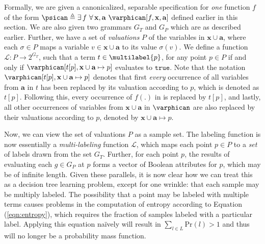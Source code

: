 Formally, we are given a canonicalized, separable \sygusbody specification
for \emph{one} function $f$ of the form $\psican \triangleq
\exists\,f\ \forall\,\mathbf{x}, \mathbf{a}\ \varphican[f, \mathbf{x},
\mathbf{a}]$ defined earlier in this section. We are also given two
grammars $G_T$ and $G_P$ which are as described earlier.  Further, we
have a set of \emph{valuations} $P$ of the variables in $\mathbf{x}
\cup \mathbf{a}$, where each $\sigma \in P$ maps a variable $v \in
\mathbf{x} \cup \mathbf{a}$ to its value $\sigma(v)$. We define a
function $\mathcal{L} : P \rightarrow 2^{G_T}$, such that a term $t
\in \multilabel{p}$, for any point $p \in P$ if and only if
$\varphican[t[p], \mathbf{x} \cup \mathbf{a} \mapsto p]$ evaluates to
$\mathtt{true}$. Note that the notation $\varphican[t[p], \mathbf{x}
\cup \mathbf{a} \mapsto p]$ denotes that first \emph{every} occurrence
of all variables from $\mathbf{a}$ in $t$ has been replaced by its
valuation according to $p$, which is denoted as $t[p]$. Following
this, every occurrence of $f(.)$ in \varphican is replaced by $t[p]$,
and lastly, all other occurrences of variables from $\mathbf{x} \cup
\mathbf{a}$ in $\varphican$ are also replaced by their valuations
according to $p$, denoted by $\mathbf{x} \cup \mathbf{a} \mapsto p$.

Now, we can view the set of valuations $P$ as a sample set. The
labeling function is now essentially a \emph{multi-labeling}
function $\mathcal{L}$, which maps each point $p \in P$ to a
\emph{set} of labels drawn from the set $G_T$. Further, for each point
$p$, the results of evaluating each $g \in G_P$ at $p$ forms a vector
of Boolean attributes for $p$, which may be of infinite length. Given
these parallels, it is now clear how we can treat this as a decision
tree learning problem, except for one wrinkle: that each sample may be
multiply labeled. The possibility that a point may be labeled with
multiple terms causes problems in the computation of entropy according
to Equation (\ref{eqn:entropy}), which requires the fraction of
samples labeled with a particular label. Applying this equation
na\"ively will result in $\sum_{l \in L}\mathrm{Pr}(l) > 1$ and thus
will no longer be a probability mass function.

